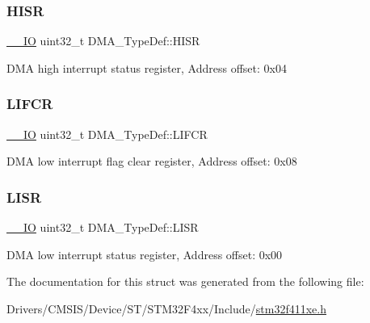 \subsubsection{\texorpdfstring{H\+I\+SR}{HISR}}
{\footnotesize\ttfamily \hyperlink{core__sc300_8h_aec43007d9998a0a0e01faede4133d6be}{\+\_\+\+\_\+\+IO} uint32\+\_\+t D\+M\+A\+\_\+\+Type\+Def\+::\+H\+I\+SR}

D\+MA high interrupt status register, Address offset\+: 0x04 \mbox{\label{struct_d_m_a___type_def_a11adb689c874d38b49fa44990323b653}} 
\subsubsection{\texorpdfstring{L\+I\+F\+CR}{LIFCR}}
{\footnotesize\ttfamily \hyperlink{core__sc300_8h_aec43007d9998a0a0e01faede4133d6be}{\+\_\+\+\_\+\+IO} uint32\+\_\+t D\+M\+A\+\_\+\+Type\+Def\+::\+L\+I\+F\+CR}

D\+MA low interrupt flag clear register, Address offset\+: 0x08 \mbox{\label{struct_d_m_a___type_def_aacb4a0977d281bc809cb5974e178bc2b}} 
\subsubsection{\texorpdfstring{L\+I\+SR}{LISR}}
{\footnotesize\ttfamily \hyperlink{core__sc300_8h_aec43007d9998a0a0e01faede4133d6be}{\+\_\+\+\_\+\+IO} uint32\+\_\+t D\+M\+A\+\_\+\+Type\+Def\+::\+L\+I\+SR}

D\+MA low interrupt status register, Address offset\+: 0x00 

The documentation for this struct was generated from the following file\+:\begin{DoxyCompactItemize}
\item 
Drivers/\+C\+M\+S\+I\+S/\+Device/\+S\+T/\+S\+T\+M32\+F4xx/\+Include/\hyperlink{stm32f411xe_8h}{stm32f411xe.\+h}\end{DoxyCompactItemize}
